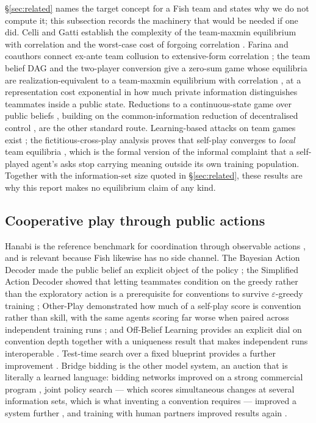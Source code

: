 \S\ref{sec:related} names the target concept for a Fish team and states why we
do not compute it; this subsection records the machinery that would be needed
if one did. Celli and Gatti establish the complexity of the team-maxmin
equilibrium with correlation and the worst-case cost of forgoing correlation
\cite{celli-gatti}. Farina and coauthors connect ex-ante team collusion to
extensive-form correlation \cite{farina-collusion}; the team belief DAG and
the two-player conversion give a zero-sum game whose equilibria are
realization-equivalent to a team-maxmin equilibrium with correlation
\cite{zhang-tbdag,carminati-tpi}, at a representation cost exponential in how
much private information distinguishes teammates inside a public state.
Reductions to a continuous-state game over public beliefs \cite{brown-rebel},
building on the common-information reduction of decentralised control
\cite{nayyar-common}, are the other standard route. Learning-based attacks on
team games exist \cite{mcaleer-teampsro,xu-fxp}; the fictitious-cross-play
analysis proves that self-play converges to \emph{local} team equilibria
\cite{xu-fxp}, which is the formal version of the informal complaint that a
self-played agent's asks stop carrying meaning outside its own training
population. Together with the information-set size quoted in
\S\ref{sec:related}, these results are why this report makes no equilibrium
claim of any kind.

\subsection{Cooperative play through public actions}

Hanabi is the reference benchmark for coordination through observable actions
\cite{bard-hanabi}, and is relevant because Fish likewise has no side channel.
The Bayesian Action Decoder made the public belief an explicit object of the
policy \cite{foerster-bad}; the Simplified Action Decoder showed that letting
teammates condition on the greedy rather than the exploratory action is a
prerequisite for conventions to survive $\varepsilon$-greedy training
\cite{hu-sad}; Other-Play demonstrated how much of a self-play score is
convention rather than skill, with the same agents scoring far worse when
paired across independent training runs \cite{hu-otherplay}; and Off-Belief
Learning provides an explicit dial on convention depth together with a
uniqueness result that makes independent runs interoperable \cite{hu-obl}.
Test-time search over a fixed blueprint provides a further improvement
\cite{lerer-sparta}. Bridge bidding is the other model system, an auction that
is literally a learned language: bidding networks improved on a strong
commercial program \cite{rong-bidding}, joint policy search --- which scores
simultaneous changes at several information sets, which is what inventing a
convention requires --- improved a system further \cite{tian-jps}, and
training with human partners improved results again \cite{lockhart-bidding}.

